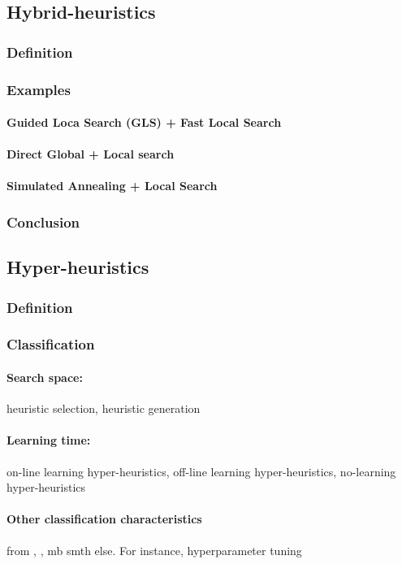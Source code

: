 \subsection{Hybrid-heuristics}
\subsubsection{Definition}
\subsubsection{Examples}
\paragraph{Guided Loca Search (GLS) + Fast Local Search} \cite{tsang1997fast}
\paragraph{Direct Global + Local search} \cite{syrjakow1999efficient}
\paragraph{Simulated Annealing + Local Search} \cite{martin1996combining}
\subsubsection{Conclusion}

\subsection{Hyper-heuristics}
\subsubsection{Definition}
\subsubsection{Classification}
\paragraph{Search space:} heuristic selection, heuristic generation
\paragraph{Learning time:} on-line learning hyper-heuristics, off-line learning hyper-heuristics, no-learning hyper-heuristics
\paragraph{Other classification characteristics} from \cite{surv:kerschke2019automated}, \cite{burke2019classification}, mb smth else. For instance, hyperparameter tuning
